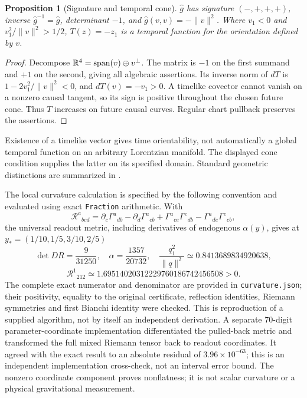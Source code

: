 \documentclass[11pt,letterpaper]{article}
\newtheorem{proposition}[theorem]{Proposition}
\theoremstyle{definition}
\numberwithin{equation}{section}
\begin{document}
\begin{proposition}[Signature and temporal cone]\label{signature}
$\widehat g$ has signature $(-,+,+,+)$, inverse $\widehat g^{-1}=\widehat g$, determinant $-1$, and $\widehat g(v,v)=-\|v\|^2$. Where $v_1<0$ and $v_1^2/\|v\|^2>1/2$, $T(z)=-z_1$ is a temporal function for the orientation defined by $v$.
\end{proposition}
\begin{proof}
Decompose $\mathbb R^4=\operatorname{span}(v)\oplus v^\perp$. The matrix is $-1$ on the first summand and $+1$ on the second, giving all algebraic assertions. Its inverse norm of $dT$ is $1-2v_1^2/\|v\|^2<0$, and $dT(v)=-v_1>0$. A timelike covector cannot vanish on a nonzero causal tangent, so its sign is positive throughout the chosen future cone. Thus $T$ increases on future causal curves. Regular chart pullback preserves the assertions.
\end{proof}
Existence of a timelike vector gives time orientability, not automatically a global temporal function on an arbitrary Lorentzian manifold. The displayed cone condition supplies the latter on its specified domain. Standard geometric distinctions are summarized in \cite{tonggr}.

The local curvature calculation is specified by the following convention and evaluated using exact \texttt{Fraction} arithmetic. With
\begin{equation}
\mathcal R^a{}_{bcd}=\partial_c\Gamma^a{}_{db}-\partial_d\Gamma^a{}_{cb}
+\Gamma^a{}_{ce}\Gamma^e{}_{db}-\Gamma^a{}_{de}\Gamma^e{}_{cb},
\end{equation}
the universal readout metric, including derivatives of endogenous $\alpha(y)$, gives at $y_*=(1/10,1/5,3/10,2/5)$
\begin{equation}\label{cert}
\det DR=\frac9{31250},\quad\alpha=\frac{1357}{20732},\quad
\frac{q_1^2}{\|q\|^2}\simeq0.8413689834920638,
\end{equation}
\begin{equation}
\mathcal R^1{}_{212}\simeq1.69514020312229760186742456508>0.
\end{equation}
The complete exact numerator and denominator are provided in \texttt{curvature.json}; their positivity, equality to the original certificate, reflection identities, Riemann symmetries and first Bianchi identity were checked. This is reproduction of a supplied algorithm, not by itself an independent derivation. A separate 70-digit parameter-coordinate implementation differentiated the pulled-back metric and transformed the full mixed Riemann tensor back to readout coordinates. It agreed with the exact result to an absolute residual of $3.96\times10^{-63}$; this is an independent implementation cross-check, not an interval error bound. The nonzero coordinate component proves nonflatness; it is not scalar curvature or a physical gravitational measurement.
\end{document}
